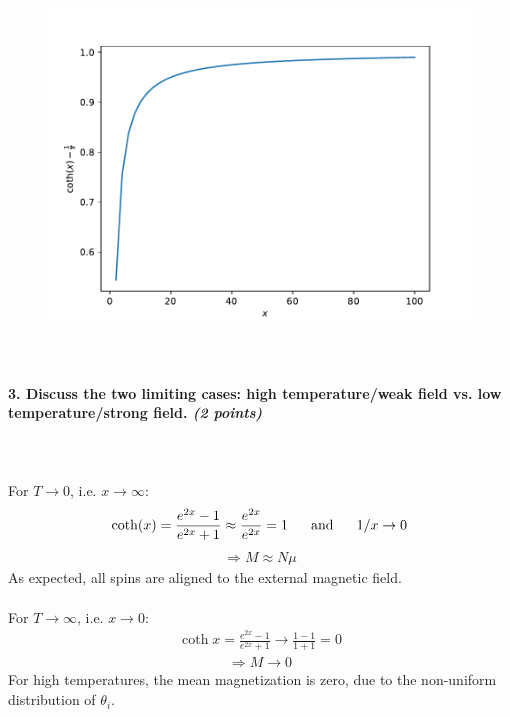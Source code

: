    \begin{figure}[h!]
        \centering
        \includegraphics[width=.6\textwidth]{./figures/magnetization.pdf}
    \end{figure} \ \\ 

\paragraph{3. Discuss the two limiting cases: 
    high temperature/weak field vs. 
    low temperature/strong field.
    \textit{(2 points)}
} \ \\
    \\
    For $T\to0$, i.e. $x\to\infty$: 
    \begin{align}
        \coth(x)=\frac{e^{2x}-1}{e^{2x}+1}
        \approx\frac{e^{2x}}{e^{2x}}=1
        \ \ \ \ \ \textnormal{and}\ \ \ \ \
        1/x\to0
    \end{align}
    \begin{align}
        \Rightarrow
        M\approx N\mu 
    \end{align}
    As expected, all spins are aligned to 
    the external magnetic field. \\ 
    \\
    For $T\to\infty$, i.e. $x\to0$: \\
    \begin{align}
        \coth x=\frac{e^{2x}-1}{e^{2x}+1}
        \to\frac{1-1}{1+1}=0
    \end{align}
    \begin{align}
        \Rightarrow
        M\to0
    \end{align}
    For high temperatures, the mean 
    magnetization is zero, due to the 
    non-uniform distribution of $\theta_i$.
